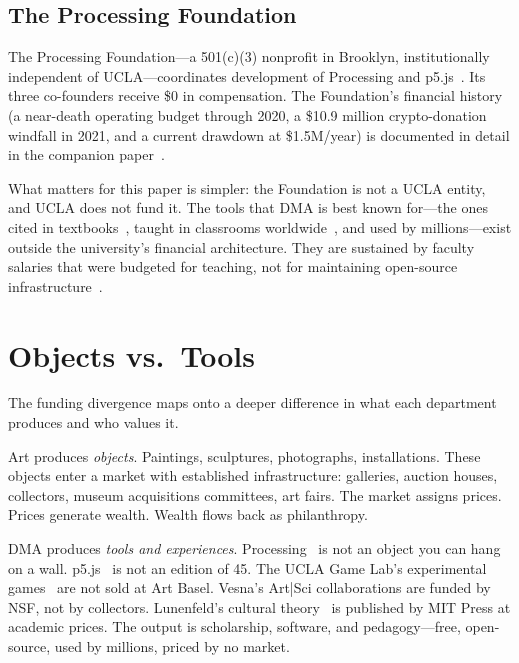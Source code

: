 \documentclass[10pt,letterpaper,twocolumn]{article}
\newcommand{\dma}{\textsc{DMA}}
\begin{document}
\subsection{The Processing Foundation}

The Processing Foundation---a 501(c)(3) nonprofit in Brooklyn, institutionally independent of UCLA---coordinates development of Processing and p5.js~\citep{processingfoundation990}. Its three co-founders receive \$0 in compensation. The Foundation's financial history (a near-death operating budget through 2020, a \$10.9 million crypto-donation windfall in 2021, and a current drawdown at \$1.5M/year) is documented in detail in the companion paper~\citep{scudder2026sustainability}.

What matters for this paper is simpler: the Foundation is not a UCLA entity, and UCLA does not fund it. The tools that DMA is best known for---the ones cited in textbooks~\citep{montfort2021exploratory, soon2020aesthetic}, taught in classrooms worldwide~\citep{greenberg2012creative}, and used by millions---exist outside the university's financial architecture. They are sustained by faculty salaries that were budgeted for teaching, not for maintaining open-source infrastructure~\citep{yin2022oss}.

\section{Objects vs.\ Tools}

The funding divergence maps onto a deeper difference in what each department produces and who values it.

Art produces \emph{objects}. Paintings, sculptures, photographs, installations. These objects enter a market with established infrastructure: galleries, auction houses, collectors, museum acquisitions committees, art fairs. The market assigns prices. Prices generate wealth. Wealth flows back as philanthropy.

\dma{} produces \emph{tools and experiences}. Processing~\citep{reas2006processing} is not an object you can hang on a wall. p5.js~\citep{mccarthy2015p5js} is not an edition of 45. The UCLA Game Lab's experimental games~\citep{stern2017howtoplay} are not sold at Art Basel. Vesna's Art|Sci collaborations are funded by NSF, not by collectors. Lunenfeld's cultural theory~\citep{lunenfeld2011secretwar} is published by MIT Press at academic prices. The output is scholarship, software, and pedagogy---free, open-source, used by millions, priced by no market.
\end{document}
